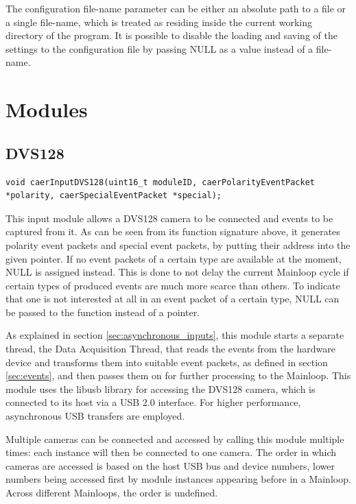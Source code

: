\documentclass[a4paper,12pt]{report}
\begin{document}
The configuration file-name parameter can be either an absolute path to a file or a single file-name, which is treated as residing inside the current working directory of the program.
It is possible to disable the loading and saving of the settings to the configuration file by passing NULL as a value instead of a file-name.

\section{Modules}

\subsection{DVS128} \label{subsec:dvs128}

\begin{lstlisting}
void caerInputDVS128(uint16_t moduleID, caerPolarityEventPacket *polarity, caerSpecialEventPacket *special);
\end{lstlisting}

This input module allows a DVS128 camera to be connected and events to be captured from it.
As can be seen from its function signature above, it generates polarity event packets and special event packets, by putting their address into the given pointer. If no event packets of a certain type are available at the moment, NULL is assigned instead. This is done to not delay the current Mainloop cycle if certain types of produced events are much more scarce than others. To indicate that one is not interested at all in an event packet of a certain type, NULL can be passed to the function instead of a pointer.

As explained in section \ref{sec:asynchronous_inputs}, this module starts a separate thread, the Data Acquisition Thread, that reads the events from the hardware device and transforms them into suitable event packets, as defined in section \ref{sec:events}, and then passes them on for further processing to the Mainloop.
This module uses the libusb library for accessing the DVS128 camera, which is connected to its host via a USB 2.0 interface. For higher performance, asynchronous USB transfers are employed.

Multiple cameras can be connected and accessed by calling this module multiple times: each instance will then be connected to one camera. The order in which cameras are accessed is based on the host USB bus and device numbers, lower numbers being accessed first by module instances appearing before in a Mainloop. Across different Mainloops, the order is undefined.
\end{document}
